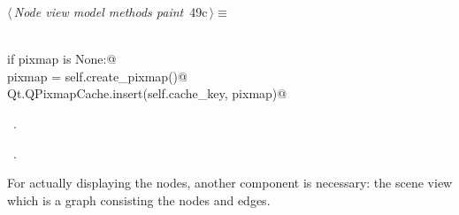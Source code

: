 \documentclass[
    a4paper,      %
    10pt,         %
    openright,    %
    notitlepage,  %
    parskip=half, %
]{scrreprt}       %
\theoremstyle{definition}                    %
\begin{document}
\begin{flushleft} \small
\begin{minipage}{\linewidth}\label{scrap71}\raggedright\small
{} $\langle\,${\itshape Node view model methods paint}\nobreak\ {\footnotesize {49c}}$\,\rangle\equiv$
\vspace{-1exm}
\begin{list}{}{} \item
\mbox{}\lstinline@@\\
\mbox{}\lstinline@    if pixmap is None:@\\
\mbox{}\lstinline@        pixmap = self.create_pixmap()@\\
\mbox{}\lstinline@        Qt.QPixmapCache.insert(self.cache_key, pixmap)@\\
\mbox{}\lstinline@@{\NWsep}
\end{list}
\vspace{-1.5ex}
\footnotesize
\begin{list}{}{\setlength{\itemsep}{-\parsep}\setlength{\itemindent}{-\leftmargin}}
\item \NWtxtMacroDefBy\ .
\item \NWtxtMacroRefIn\ .

\item{}
\end{list}
\end{minipage}\vspace{4ex}
\end{flushleft}
For actually displaying the nodes, another component is necessary: the scene
view which is a graph consisting the nodes and edges.
\end{document}
